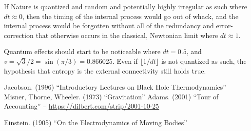 \documentclass[12pt]{article}
\begin{document}
If Nature is quantized and random and potentially highly irregular as such where $dt \approx 0$, then the timing of the internal process would go out of whack, and the internal process would be forgotten without all of the redundancy and error-correction that otherwise occurs in the classical, Newtonian limit where $dt \approx 1$.

Quantum effects should start to be noticeable where $dt = 0.5$, and $v = \sqrt{3} / 2 = \sin(\pi/3) = 0.866025$.
Even if $ \lfloor{1}/{dt} \rfloor$ is not quantized as such, the hypothesis that entropy is the external connectivity still holds true.






\begin{thebibliography}{9}
 Jacobson. (1996) ``Introductory Lectures on Black Hole Thermodynamics''
 Misner, Thorne, Wheeler. (1973) ``Gravitation''
 Adams. (2001) ``Tour of Accounting'' -- \url{https://dilbert.com/strip/2001-10-25}

 Einstein. (1905) ``On the Electrodynamics of Moving Bodies''

\end{thebibliography}
\end{document}
